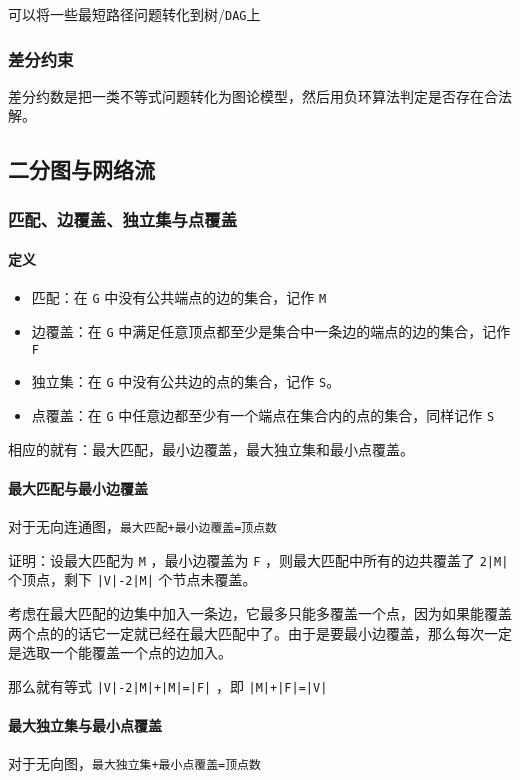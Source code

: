 \documentclass[UTF-8]{ctexart}
\begin{document}
	可以将一些最短路径问题转化到树/\texttt{DAG}上
	\subsubsection{差分约束}
	差分约数是把一类不等式问题转化为图论模型，然后用负环算法判定是否存在合法解。
	\subsection{二分图与网络流}
	\subsubsection{匹配、边覆盖、独立集与点覆盖}
	\paragraph{定义}
	\begin{itemize}
		\item 匹配：在 \texttt{G} 中没有公共端点的边的集合，记作 \texttt{M}
		\item 边覆盖：在 \texttt{G} 中满足任意顶点都至少是集合中一条边的端点的边的集合，记作 \texttt{F}
		\item 独立集：在 \texttt{G} 中没有公共边的点的集合，记作 \texttt{S}。
		\item 点覆盖：在 \texttt{G} 中任意边都至少有一个端点在集合内的点的集合，同样记作 \texttt{S}
	\end{itemize}
	相应的就有：最大匹配，最小边覆盖，最大独立集和最小点覆盖。
	\paragraph{最大匹配与最小边覆盖} 对于无向连通图，\texttt{最大匹配+最小边覆盖=顶点数}
	
	证明：设最大匹配为 \texttt{M} ，最小边覆盖为 \texttt{F} ，则最大匹配中所有的边共覆盖了 \texttt{2|M|} 个顶点，剩下 \texttt{|V|-2|M|} 个节点未覆盖。
	
	考虑在最大匹配的边集中加入一条边，它最多只能多覆盖一个点，因为如果能覆盖两个点的的话它一定就已经在最大匹配中了。由于是要最小边覆盖，那么每次一定是选取一个能覆盖一个点的边加入。
	
	那么就有等式 \texttt{|V|-2|M|+|M|=|F|} ，即 \texttt{|M|+|F|=|V|}
	
	\paragraph{最大独立集与最小点覆盖} 对于无向图，\texttt{最大独立集+最小点覆盖=顶点数}
	
\end{document}
